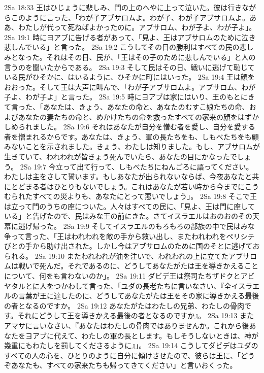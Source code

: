 2Sa 18:33  王はひじょうに悲しみ、門の上のへやに上って泣いた。彼は行きながらこのように言った、「わが子アブサロムよ。わが子、わが子アブサロムよ。ああ、わたしが代って死ねばよかったのに。アブサロム、わが子よ、わが子よ」。
2Sa 19:1  時にヨアブに告げる者があって、「見よ、王はアブサロムのために泣き悲しんでいる」と言った。
2Sa 19:2  こうしてその日の勝利はすべての民の悲しみとなった。それはその日、民が、「王はその子のために悲しんでいる」と人の言うのを聞いたからである。
2Sa 19:3  そして民はその日、戦いに逃げて恥じている民がひそかに、はいるように、ひそかに町にはいった。
2Sa 19:4  王は顔をおおった。そして王は大声に叫んで、「わが子アブサロムよ。アブサロム、わが子よ、わが子よ」と言った。
2Sa 19:5  時にヨアブは家にはいり、王のもとにきて言った、「あなたは、きょう、あなたの命と、あなたのむすこ娘たちの命、およびあなたの妻たちの命と、めかけたちの命を救ったすべての家来の顔をはずかしめられました。
2Sa 19:6  それはあなたが自分を憎む者を愛し、自分を愛する者を憎まれるからです。あなたは、きょう、軍の長たちをも、しもべたちをも顧みないことを示されました。きょう、わたしは知りました。もし、アブサロムが生きていて、われわれが皆きょう死んでいたら、あなたの目にかなったでしょう。
2Sa 19:7  今立って出て行って、しもべたちにねんごろに語ってください。わたしは主をさして誓います。もしあなたが出られないならば、今夜あなたと共にとどまる者はひとりもないでしょう。これはあなたが若い時から今までにこうむられたすべての災よりも、あなたにとって悪いでしょう」。
2Sa 19:8  そこで王は立って門のうちの座についた。人々はすべての民に、「見よ、王は門に座している」と告げたので、民はみな王の前にきた。さてイスラエルはおのおのその天幕に逃げ帰った。
2Sa 19:9  そしてイスラエルのもろもろの部族の中で民はみな争って言った、「王はわれわれを敵の手から救い出し、またわれわれをペリシテびとの手から助け出された。しかし今はアブサロムのために国のそとに逃げておられる。
2Sa 19:10  またわれわれが油を注いで、われわれの上に立てたアブサロムは戦いで死んだ。それであるのに、どうしてあなたがたは王を導きかえることについて、何をも言わないのか」。
2Sa 19:11  ダビデ王は祭司たちザドクとアビヤタルとに人をつかわして言った、「ユダの長老たちに言いなさい、『全イスラエルの言葉が王に達したのに、どうしてあなたがたは王をその家に導きかえる最後の者となるのですか。
2Sa 19:12  あなたがたはわたしの兄弟、わたしの骨肉です。それにどうして王を導きかえる最後の者となるのですか』。
2Sa 19:13  またアマサに言いなさい、『あなたはわたしの骨肉ではありませんか。これから後あなたをヨアブに代えて、わたしの軍の長とします。もしそうしないときは、神が幾重にもわたしを罰してくださるように』」。
2Sa 19:14  こうしてダビデはユダのすべての人の心を、ひとりのように自分に傾けさせたので、彼らは王に、「どうぞあなたも、すべての家来たちも帰ってきてください」と言いおくった。
